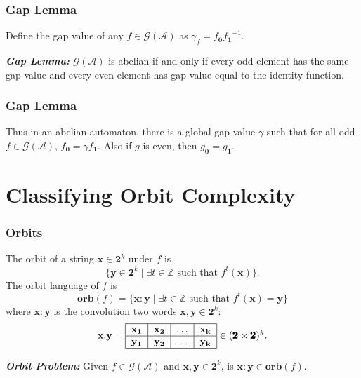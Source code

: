 \documentclass{beamer}
\newcommand{\Z}{\mathbb{Z}}
\newcommand{\ch}[1]{\mathbf{#1}}
\newcommand{\A}{\mathcal{A}}
\newcommand{\gp}{\mathcal{G}}
\newcommand{\res}[2]{{{#1}_{\ch{#2}}}}
\newcommand{\bin}{\pmb{\bm{2}}}
\newcommand{\orb}{\mathbf{orb}}
\begin{document}
\begin{frame}
    \frametitle{Gap Lemma}
    Define the \alert{gap value} of any $f \in \gp(\A)$ as
    $\gamma_{f} = \res{f}{0} \res{f}{1}^{-1}$.
    \pause

    \vspace{.5cm}
    {\bf \emph{Gap Lemma:}} $\gp(\A)$ is abelian if and only if every odd element
    has the same gap value and every even element has gap value equal to
    the identity function.

\end{frame}
\begin{frame}
    \frametitle{Gap Lemma}
    Thus in an abelian automaton, there is a global gap value $\gamma$ such
    that for all odd $f \in \gp(\A)$, $\res{f}{0} = \gamma \res{f}{1}$. Also if
    $g$ is even, then $\res{g}{0} = \res{g}{1}$.

    \vspace{.5cm}
    \begin{center}
    \end{center}
\end{frame}

\section{Classifying Orbit Complexity}

\begin{frame}
    \frametitle{Orbits}
    The \alert{orbit} of a string $\ch{x} \in \bin^k$ under $f$ is
    \[
        \{\ch{y} \in \bin^k \mid \exists t \in \Z \text{ such that }
        f^t(\ch{x})\}.
    \]
    \pause
    The \alert{orbit language} of $f$ is
    \[
        \orb(f) = \{\ch{x}{:}{\ch{y} \mid \exists t \in \Z
                \text{ such that } f^t (\ch{x}) = \ch{y}}\}
    \]
    where $\ch{x} {:} \ch{y}$ is the convolution two words $\ch{x}, \ch{y}
    \in \bin^k$:
    \[
        \ch{x} {:} \ch{y} = \begin{tabular}{|c|c|c|c|}
            \hline
            $\ch{x_1}$ & $\ch{x_2}$ & $\ldots$ & $\ch{x_k}$\\
            \hline
            $\ch{y_1}$ & $\ch{y_2}$ & $\ldots$ & $\ch{y_k}$\\
            \hline
        \end{tabular} \in (\bin \times \bin)^k.
    \]
    \pause

    \vspace{.5cm}
    {\bf \emph{Orbit Problem:}} Given $f \in \gp(\A)$ and $\ch{x}, \ch{y}
    \in \bin^k$, is $\ch{x}{:}\ch{y} \in \orb(f)$.
\end{frame}
\end{document}
